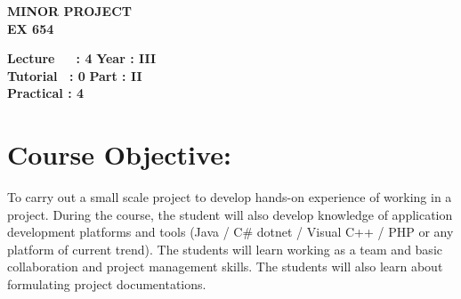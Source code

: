 \begin{center}
    \textbf{\huge{\uppercase{Minor Project}}}
    \\
    \vspace{.5cm}
    \textbf{\large{EX 654}}
\end{center}

\noindent\textbf{Lecture\ \ \ : 4} \hfill \textbf{Year : III} \\
\textbf{Tutorial \ : 0} \hfill \textbf{Part : II } \\
\textbf{Practical : 4}  \\

\par
\noindent 
\section*{Course Objective:}
To carry out a small scale project to develop hands-on experience of working in a project. During the course, the student will also develop knowledge of application development platforms and tools (Java / C\# dotnet / Visual C++ / PHP or any platform of current trend). The students will learn working as a team and basic collaboration and project management skills. The students will also learn about formulating project documentations.


